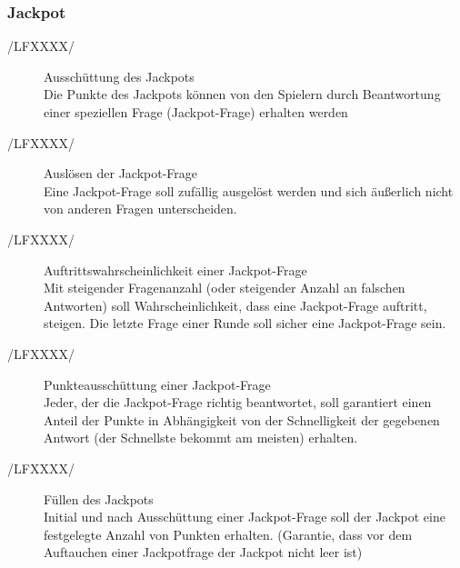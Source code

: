 \documentclass[11pt,a4paper]{scrreprt}
\begin{document}
\subsubsection{Jackpot}
\begin{description}
\item[/LFXXXX/] Ausschüttung des Jackpots \\
Die Punkte des Jackpots können von den Spielern durch Beantwortung einer speziellen Frage (Jackpot-Frage) erhalten werden

\item[/LFXXXX/]Auslösen der Jackpot-Frage \\
Eine Jackpot-Frage soll zufällig ausgelöst werden und sich äußerlich nicht von anderen Fragen unterscheiden.

\item[/LFXXXX/] Auftrittswahrscheinlichkeit einer Jackpot-Frage \\
Mit steigender Fragenanzahl (oder steigender Anzahl an falschen Antworten) soll Wahrscheinlichkeit, dass eine Jackpot-Frage auftritt, steigen. Die letzte Frage einer Runde soll sicher eine Jackpot-Frage sein.

\item[/LFXXXX/] Punkteausschüttung einer Jackpot-Frage \\
Jeder, der die Jackpot-Frage richtig beantwortet, soll garantiert einen Anteil der Punkte in Abhängigkeit von der Schnelligkeit der gegebenen Antwort (der Schnellste bekommt am meisten) erhalten.

\item[/LFXXXX/] Füllen des Jackpots \\
Initial und nach Ausschüttung einer Jackpot-Frage soll der Jackpot eine festgelegte Anzahl von Punkten erhalten. (Garantie, dass vor dem Auftauchen einer Jackpotfrage der Jackpot nicht leer ist)

\end{description}
\end{document}
